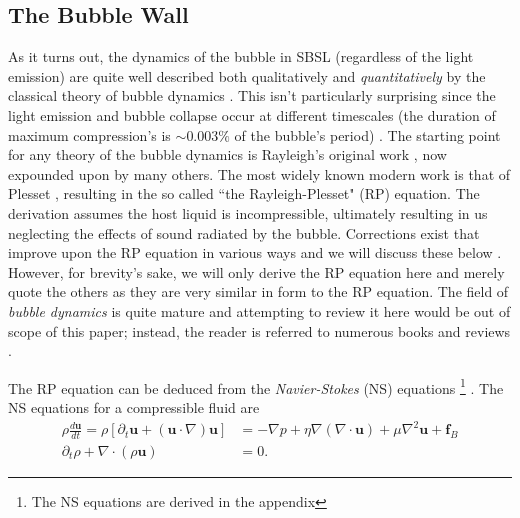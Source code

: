 \documentclass[rmp,aps,nofootinbib,superscriptaddress,floatfix]{revtex4-2}
\begin{document}
\subsection{The Bubble Wall}
As it turns out, the dynamics of the bubble in SBSL (regardless of the light emission) are quite well described both qualitatively and \emph{quantitatively} by the classical theory of bubble dynamics \cite{prosperetti1999old,brenner2002single,prosperetti1986bubble,plesset1977bubble,suslick2008inside,yasui2018acoustic,brennen2014cavitation}. This isn't particularly surprising since the light emission and bubble collapse occur at different timescales (the duration of maximum compression's is $\sim 0.003\%$ of the bubble's period) \cite{suslick2008inside,prosperetti1999old,brenner2002single,prosperetti1986bubble,plesset1977bubble}. The starting point for any theory of the bubble dynamics is Rayleigh's original work \cite{rayleigh1917pressure}, now expounded upon by many others. The most widely known modern work is that of Plesset \cite{plesset1977bubble,plesset1949dynamics,prosperetti1986bubble}, resulting in the so called ``the Rayleigh-Plesset" (RP) equation. The derivation assumes the host liquid is incompressible, ultimately resulting in us neglecting the effects of sound radiated by the bubble. Corrections exist that improve upon the RP equation in various ways and we will discuss these below \cite{}. However, for brevity's sake, we will only derive the RP equation here and merely quote the others as they are very similar in form to the RP equation. The field of \emph{bubble dynamics} is quite mature and attempting to review it here would be out of scope of this paper; instead, the reader is referred to numerous books and reviews \cite{prosperetti1999old,brenner2002single,yasui2018acoustic,prosperetti1986bubble}. 

The RP equation can be deduced from the \emph{Navier-Stokes} (NS) equations \footnote{The NS equations are derived in the appendix} \cite{prosperetti1999old,brenner2002single,prosperetti1986bubble,plesset1977bubble,suslick2008inside,yasui2018acoustic}. The NS equations for a compressible fluid are
\begin{equation}
\begin{split}
    \rho \frac{d \bm{u}}{dt} = \rho \left[ \partial_t \bm{u}+\left(\bm{u}\cdot \nabla \right)\bm{u} \right] & =-\nabla p + \eta \nabla \left(\nabla \cdot \bm{u} \right)+\mu \nabla^2 \bm{u} + \bm{f}_B \\ 
     \partial_t \rho+\nabla\cdot(\rho \bm{u}) & = 0.
     \label{eq:NS_equations}
\end{split}
\end{equation}
\end{document}
